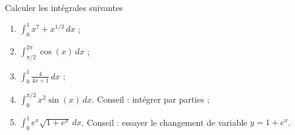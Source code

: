\begin{exercice}\label{exoExamen-0004}
  
Calculer les intégrales suivantes
\begin{enumerate}
\item $\displaystyle \int_{0}^{1}x^{7}+x^{1/3}\,dx$ ;
\item $\displaystyle \int_{\pi/2}^{2\pi}\cos(x)\,dx$ ;
\item $\displaystyle \int_{0}^{1}\frac{4}{4x+1}\,dx$ ;
\item $\displaystyle \int_{0}^{\pi/2}x^2\sin(x)\,dx$. Conseil : intégrer par parties ;
\item $\displaystyle \int_{0}^{1}e^x\sqrt{1+e^x}\,dx$. Conseil : essayer le changement de variable $y=1+e^x$.
\end{enumerate}
\end{exercice}
